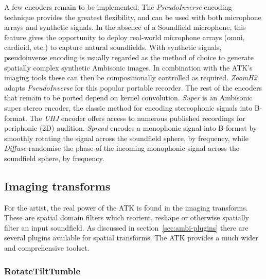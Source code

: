 \documentclass{article}
\begin{document}
A few encoders remain to be implemented:
The \emph{PseudoInverse} encoding technique provides the greatest flexibility, and can be used with both microphone arrays and synthetic signals. 
In the absence of a Soundfield microphone, this feature gives the opportunity to deploy real-world microphone arrays (omni, cardioid, etc.) to capture natural soundfields.
With synthetic signals, pseudoinverse encoding is usually regarded as the method of choice to generate spatially complex synthetic Ambisonic images.
In combination with the ATK's imaging tools these can then be compositionally controlled as required.
\emph{Zoom\-H2} adapts \emph{PseudoInverse} for this popular portable recorder.
The rest of the encoders that remain to be ported depend on kernel convolution.
\emph{Super} is an Ambisonic super stereo encoder, the classic method for encoding stereophonic signals into B-format.
The \emph{UHJ} encoder offers access to numerous published recordings for periphonic (2D) audition.
\emph{Spread} encodes a monophonic signal into B-format by smoothly rotating the signal across the soundfield sphere, by frequency, while \emph{Diffuse} randomise the phase of the incoming monophonic signal across the soundfield sphere, by frequency.




\subsection{Imaging transforms}\label{sec:transforms}

For the artist, the real power of the ATK is found in the imaging transforms.
These are spatial domain filters which reorient, reshape or otherwise spatially filter an input soundfield.
As discussed in section~\ref{sec:ambi-plugins} there are several plugins available for spatial transforms.
The ATK provides a much wider and comprehensive toolset.

\subsubsection{RotateTiltTumble}\label{sec:rotate}
\end{document}
